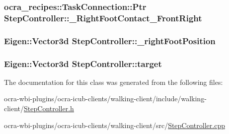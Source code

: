 \hypertarget{classStepController_a9f06562625b657c280dc688bcad421be}{
\subsubsection[{\-\_\-\-Right\-Foot\-Contact\-\_\-\-Front\-Right}]{\setlength{\rightskip}{0pt plus 5cm}ocra\-\_\-recipes\-::\-Task\-Connection\-::\-Ptr {\bf \-Step\-Controller\-::\-\_\-\-Right\-Foot\-Contact\-\_\-\-Front\-Right}}}\label{classStepController_a9f06562625b657c280dc688bcad421be}
\hypertarget{classStepController_a064d9f5406f9221e4351617a177c1cef}{
\subsubsection[{\-\_\-right\-Foot\-Position}]{\setlength{\rightskip}{0pt plus 5cm}\-Eigen\-::\-Vector3d {\bf \-Step\-Controller\-::\-\_\-right\-Foot\-Position}}}\label{classStepController_a064d9f5406f9221e4351617a177c1cef}
\hypertarget{classStepController_a588d5b149eb4a6877e89ecff37d0f91d}{
\subsubsection[{target}]{\setlength{\rightskip}{0pt plus 5cm}\-Eigen\-::\-Vector3d {\bf \-Step\-Controller\-::target}}}\label{classStepController_a588d5b149eb4a6877e89ecff37d0f91d}


\-The documentation for this class was generated from the following files\-:\begin{DoxyCompactItemize}
\item 
ocra-\/wbi-\/plugins/ocra-\/icub-\/clients/walking-\/client/include/walking-\/client/\hyperlink{StepController_8h}{\-Step\-Controller.\-h}\item 
ocra-\/wbi-\/plugins/ocra-\/icub-\/clients/walking-\/client/src/\hyperlink{StepController_8cpp}{\-Step\-Controller.\-cpp}\end{DoxyCompactItemize}
